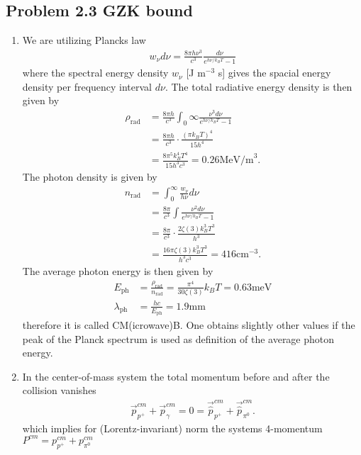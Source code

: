 \documentclass[../main.tex]{subfiles}
\begin{document}
\subsection{Problem 2.3 GZK bound}
\begin{enumerate}
    \item We are utilizing Plancks law
    \begin{align}
        w_\nu d\nu = \frac{8\pi h\nu^3}{c^3}\frac{d\nu}{e^{h\nu/k_BT}-1}
    \end{align}
    where the spectral energy density $w_\nu$ [J m$^{-3}$ s] gives the spacial energy density per frequency interval $d\nu$. The total radiative energy density is then given by
    \begin{align}
        \rho_\text{rad} &= \frac{8\pi h}{c^3}\int_0\infty \frac{\nu^3d\nu}{e^{h\nu/k_BT}-1}\\
        &=\frac{8\pi h}{c^3}\cdot\frac{(\pi k_B T)^4}{15h^4}\\
        &=\frac{8\pi^5k_B^4 T^4}{15h^3 c^3}=0.26\text{MeV/m}^3.
    \end{align}
    The photon density is given by
    \begin{align}
        n_\text{rad} &=\int_0^\infty\frac{w_\nu}{h\nu}d\nu\\
        &= \frac{8\pi}{c^3}\int \frac{\nu^2d\nu}{e^{h\nu/k_BT}-1}\\
        &=\frac{8\pi}{c^3}\cdot\frac{2\zeta(3) k_B^3 T^3}{h^3}\\
        &=\frac{16\pi\zeta(3) k_B^3 T^3}{h^3c^3}=416\text{cm}^{-3}.
    \end{align}
    The average photon energy is then given by
    \begin{align}
        E_\text{ph}&=\frac{\rho_\text{rad}}{n_\text{rad}}=\frac{\pi^4}{30\zeta(3)}k_BT=0.63\text{meV}\\
        \lambda_\text{ph}&=\frac{hc}{E_\text{ph}}=1.9\text{mm}
    \end{align}
    therefore it is called CM(icrowave)B.
    One obtains slightly other values if the peak of the Planck spectrum is used as definition of the average photon energy.
    \item In the center-of-mass system the total momentum before and after the collision vanishes
    \begin{align}
        \vec{p}_{p^+}^{cm}+\vec{p}_\gamma^{cm}=0=\vec{\hat{p}}_{p^+}^{cm}+\vec{\hat{p}}_{\pi^0}^{cm}.
    \end{align}
    which implies for (Lorentz-invariant) norm the systems 4-momentum $P^{cm}=p_{p^+}^{cm}+p_{\pi^0}^{cm}$

\end{enumerate}
\end{document}
